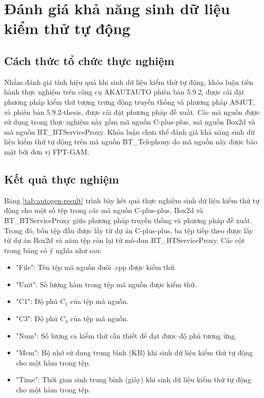 \section{Đánh giá khả năng sinh dữ liệu kiểm thử tự động}
\subsection{Cách thức tổ chức thực nghiệm}
Nhằm đánh giá tính hiệu quả khi sinh dữ liệu kiểm thử tự động, khóa luận tiến hành thực nghiệm trên công cụ AKAUTAUTO phiên bản 5.9.2, được cài đặt phương pháp kiểm thử tượng trưng động truyền thống và phương pháp AS4UT, và phiên bản 5.9.2-thesis, được cài đặt phương pháp đề xuất. Các mã nguồn được sử dụng trong thực nghiệm này gồm mã nguồn C-plus-plus, mã nguồn Box2d và mã nguồn BT\_BTServiceProxy. Khóa luận chưa thể đánh giá khả năng sinh dữ liệu kiểm thử tự động trên mã nguồn BT\_Telephony do mã nguồn này được bảo mật bởi đơn vị FPT-GAM.

\subsection{Kết quả thực nghiệm}
Bảng \ref{tab:autogen-result} trình bày kết quả thực nghiệm sinh dữ liệu kiểm thử tự động cho một số tệp trong các mã nguồn C-plus-plus, Box2d và BT\_BTServiceProxy giữa phương pháp truyền thống và phương pháp đề xuất. Trong đó, bốn tệp đầu được lấy từ dự án C-plus-plus, ba tệp tiếp theo được lấy từ dự án Box2d và năm tệp còn lại từ mô-đun BT\_BTServiceProxy. Các cột trong bảng có ý nghĩa như sau:
\begin{itemize}
    \item "File": Tên tệp mã nguồn đuôi .cpp được kiểm thử.
    \item "Unit": Số lượng hàm trong tệp mã nguồn được kiểm thử.
    \item "C1": Độ phủ $C_1$ của tệp mã nguồn.
    \item "C3": Độ phủ $C_3$ của tệp mã nguồn.
    \item "Num": Số lượng ca kiểm thử cần thiết để đạt được độ phủ tương ứng.
    \item "Mem": Bộ nhớ sử dụng trung bình (KB) khi sinh dữ liệu kiểm thử tự động cho một hàm trong tệp.
    \item "Time": Thời gian sinh trung bình (giây) khi sinh dữ liệu kiểm thử tự động cho một hàm trong tệp.
\end{itemize}


